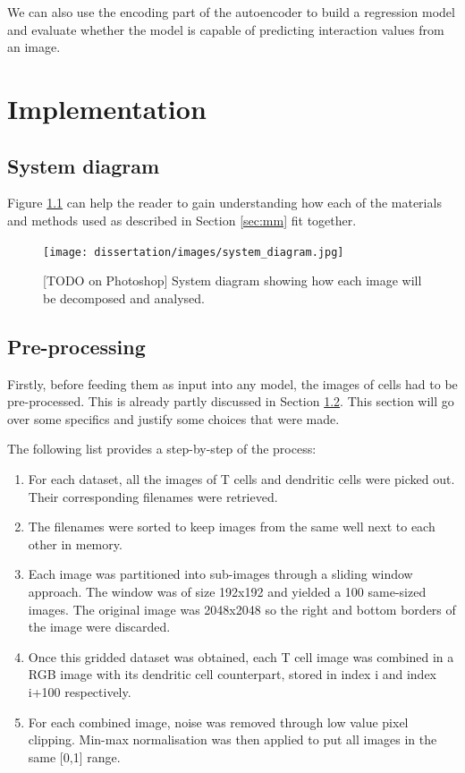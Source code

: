 \documentclass{l4proj}
\begin{document}
We can also use the encoding part of the autoencoder to build a regression model and evaluate whether the model is capable of predicting interaction values from an image.



\chapter{Implementation}

\section{System diagram}

Figure \ref{fig:system} can help the reader to gain understanding how each of the materials and methods used as described in Section \ref{sec:mm} fit together.

\begin{figure}[h!]
    \centering
    \texttt{[image: dissertation/images/system\_diagram.jpg]}
    \caption{[TODO on Photoshop] System diagram showing how each image will be decomposed and analysed.}
    \label{fig:system}
\end{figure}

\section{Pre-processing}

Firstly, before feeding them as input into any model, the images of cells had to be pre-processed. This is already partly discussed in Section \ref{}. This section will go over some specifics and justify some choices that were made.

\bigskip
The following list provides a step-by-step of the process:
\begin{enumerate}
    \item For each dataset, all the images of T cells and dendritic cells were picked out. Their corresponding filenames were retrieved.
    \item The filenames were sorted to keep images from the same well next to each other in memory.
    \item Each image was partitioned into sub-images through a sliding window approach. The window was of size 192x192 and yielded a 100 same-sized images. The original image was 2048x2048 so the right and bottom borders of the image were discarded.
    \item Once this gridded dataset was obtained, each T cell image was combined in a RGB image with its dendritic cell counterpart, stored in index i and index i+100 respectively.
    \item For each combined image, noise was removed through low value pixel clipping. Min-max normalisation was then applied to put all images in the same [0,1] range.
\end{enumerate}
\end{document}
